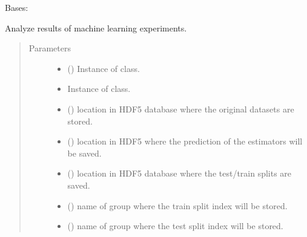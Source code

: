 \documentclass[letterpaper,10pt,english]{sphinxmanual}
\begin{document}
\begin{fulllineitems}
\label{\detokenize{analyze_results:mleap.analyze_results.analyze_results.AnalyseResults}}
Bases: 

Analyze results of machine learning experiments.
\begin{quote}\begin{description}
\item[{Parameters}] \leavevmode\begin{itemize}
\item {} 
 ({\hyperref[\detokenize{shared:mleap.shared.files_io.FilesIO}]{}}) \textendash{} Instance of {\hyperref[\detokenize{shared:mleap.shared.files_io.FilesIO}]{}} class.

\item {} 
 \textendash{} Instance of {\hyperref[\detokenize{shared:mleap.shared.files_io.FilesIO}]{}} class.

\item {} 
 () \textendash{} location in HDF5 database where the original datasets are stored.

\item {} 
 () \textendash{} location in HDF5 where the prediction of the estimators will be saved.

\item {} 
 () \textendash{} location in HDF5 database where the test/train splits are saved.

\item {} 
 () \textendash{} name of group where the train split index will be stored.

\item {} 
 () \textendash{} name of group where the test split index will be stored.


\end{itemize}
\end{description}
\end{quote}
\end{fulllineitems}
\end{document}
